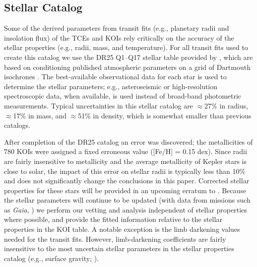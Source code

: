 \subsection{Stellar Catalog}
\label{s:stars}
Some of the derived parameters from transit fits (e.g., planetary radii and insolation flux) of the TCEs and KOIs rely critically on the accuracy of the stellar properties (e.g., radii, mass, and temperature). For all transit fits used to create this catalog we use the DR25 Q1--Q17 stellar table provided by \citet{Mathur2017ApJS}, which are based on conditioning published atmospheric parameters on a grid of Dartmouth isochrones \citep{Dotter2008}. The best-available observational data for each star is used to determine the stellar parameters; e.g., asteroseismic or high-resolution spectroscopic data, when available, is used instead of broad-band photometric measurements. Typical uncertainties in this stellar catalog are $\approx$27\% in radius, $\approx$17\% in mass, and $\approx$51\% in density, which is somewhat smaller than previous catalogs.

{\color{blue}After completion of the DR25 catalog an error was discovered; the metallicities of 780 KOIs were assigned a fixed erroneous value ([Fe/H] = 0.15 dex). Since radii are fairly insensitive to metallicity and the average metallicity of Kepler stars is close to solar, the impact of this error on stellar radii is typically less than 10\% and does not significantly change the conclusions in this paper. Corrected stellar properties for these stars will be provided in an upcoming erratum to \citet{Mathur2017ApJS}. Because the stellar parameters will continue to be updated (with data from missions such as \emph{Gaia}, \citealt{gaia1,gaia2}) we perform our vetting and analysis independent of stellar properties where possible, and provide the fitted information relative to the stellar properties in the KOI table.  A notable exception is the limb darkening values needed for the transit fits. However, limb-darkening coefficients are fairly insensitive to the most uncertain stellar parameters in the stellar properties catalog (e.g., surface gravity; \citealt{Claret2000}).
}